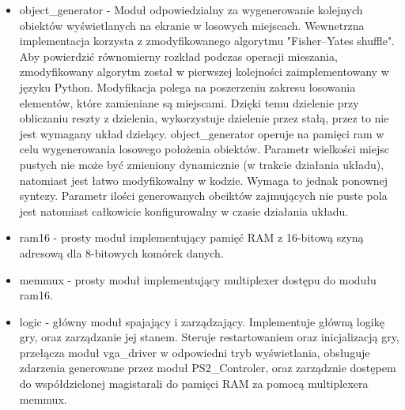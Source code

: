 \documentclass[polish,polish,a4paper]{article}
\begin{document}
\begin{itemize}
 \item
  object\_generator - Moduł odpowiedzialny za wygenerowanie kolejnych obiektów wyświetlanych na ekranie w losowych miejscach.
  Wewnetrzna implementacja korzysta z zmodyfikowanego algorytmu "Fisher–Yates shuffle".
  Aby powierdzić równomierny rozkład podczas operacji mieszania, zmodyfikowany algorytm został w pierwszej kolejności zaimplementowany w języku Python.
  Modyfikacja polega na poszerzeniu zakresu losowania elementów, które zamieniane są miejscami.
  Dzięki temu dzielenie przy obliczaniu reszty z dzielenia, wykorzystuje dzielenie przez stałą, przez to nie jest wymagany układ dzielący.
  object\_generator operuje na pamięci ram w celu wygenerowania losowego położenia obiektów.
  Parametr wielkości miejsc pustych nie może być zmieniony dynamicznie (w trakcie działania układu), natomiast jest łatwo modyfikowalny w kodzie.
  Wymaga to jednak ponownej syntezy.
  Parametr ilości generowanych obeiktów zajmujących nie puste pola jest natomiast całkowicie konfigurowalny w czasie działania układu.

 \item
   ram16 - prosty moduł implementujący pamięć RAM z 16-bitową szyną adresową dla 8-bitowych komórek danych.

 \item
   memmux - prosty moduł implementujący multiplexer dostępu do modułu ram16.

 \item
  logic - główny moduł spajający i zarządzający.
  Implementuje główną logikę gry, oraz zarządzanie jej stanem.
  Steruje restartowaniem oraz inicjalizacją gry, przełącza moduł vga\_driver w odpowiedni tryb wyświetlania, obsługuje zdarzenia generowane przez moduł 
  PS2\_Controler, oraz zarządznie dostępem do współdzielonej magistarali do pamięci RAM za pomocą multiplexera memmux.


\end{itemize}
\end{document}
